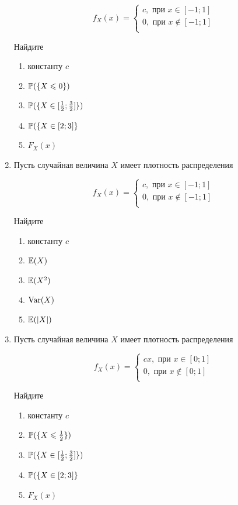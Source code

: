 \begin{enumerate}
\[
f_X(x) =
	\begin{cases}
	c,\text{ при }  x \in [-1; 1] \\
	0,\text{ при } x \notin  [-1; 1] \\
	\end{cases}
\]

Найдите
\begin{enumerate}
	\item константу $c$
	\item $\P(\{X \leq 0\})$
	\item $\P(\{X \in [\frac{1}{2}; \frac{3}{2}]\})$
	\item $\P(\{X \in [2;3]\}$
	\item $F_X(x)$
\end{enumerate}


\item Пусть случайная величина $X$ имеет плотность распределения

\[
f_X(x) =
	\begin{cases}
	c,\text{ при }  x \in [-1; 1] \\
	0,\text{ при } x \notin  [-1; 1] \\
	\end{cases}
\]

Найдите
\begin{enumerate}
	\item константу $c$
	\item $\E(X)$
	\item $\E(X^2)$
	\item $\Var(X)$
	\item $\E(|X|)$
\end{enumerate}


\item Пусть случайная величина $X$ имеет плотность распределения

\[
f_X(x) =
	\begin{cases}
	cx,\text{ при }  x \in [0; 1] \\
	0,\text{ при } x \notin  [0; 1] \\
	\end{cases}
\]

Найдите
\begin{enumerate}
	\item константу $c$
	\item $\P(\{X \leq \frac{1}{2}\})$
	\item $\P(\{X \in [\frac{1}{2}; \frac{3}{2}]\})$
	\item $\P(\{X \in [2;3]\}$
	\item $F_X(x)$
\end{enumerate}



\end{enumerate}
